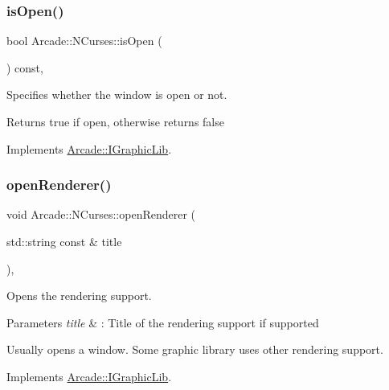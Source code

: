 \subsubsection{\texorpdfstring{is\+Open()}{isOpen()}}
{\footnotesize\ttfamily bool Arcade\+::\+N\+Curses\+::is\+Open (\begin{DoxyParamCaption}{ }\end{DoxyParamCaption}) const\hspace{0.3cm}{\ttfamily [final]}, {\ttfamily [virtual]}}



Specifies whether the window is open or not. 

\begin{DoxyReturn}{Returns}
true if open, otherwise returns false 
\end{DoxyReturn}


Implements \hyperlink{class_arcade_1_1_i_graphic_lib_adf9e107fbcfbd91e5a3daa9a2db76b4b}{Arcade\+::\+I\+Graphic\+Lib}.

\mbox{\label{class_arcade_1_1_n_curses_a2bebb6d17c26471866a4403c64cda006}} 
\subsubsection{\texorpdfstring{open\+Renderer()}{openRenderer()}}
{\footnotesize\ttfamily void Arcade\+::\+N\+Curses\+::open\+Renderer (\begin{DoxyParamCaption}\item[{std\+::string const \&}]{title }\end{DoxyParamCaption})\hspace{0.3cm}{\ttfamily [final]}, {\ttfamily [virtual]}}



Opens the rendering support. 


\begin{DoxyParams}{Parameters}
{\em title} & \+: Title of the rendering support if supported\\
\hline
\end{DoxyParams}
Usually opens a window. Some graphic library uses other rendering support. 

Implements \hyperlink{class_arcade_1_1_i_graphic_lib_a71f7f51bdd61b02377c4a9ec330eabb1}{Arcade\+::\+I\+Graphic\+Lib}.

